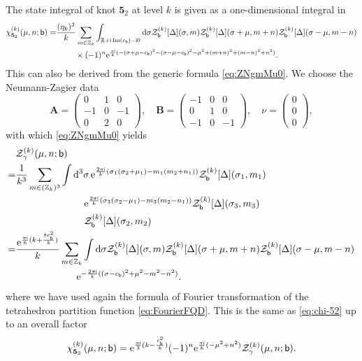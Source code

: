 \documentclass[a4paper,11pt]{article}	%
\DeclareMathOperator{\imag}{Im}
\def\mc{\mathcal}
\def\md{\mathbf}
\def\ms{\mathsf}
\def\IR{\mathbb{R}}
\def\IZ{\mathbb{Z}}
\newcommand{\re}{{\rm e}}
\newcommand{\ri}{{\mathsf{i}}}
\newcommand{\rd}{{\rm d}}
\newcommand{\nn}{\nonumber \\}
\newcommand{\bb}{\ms{b}}
\newcommand{\s}{\sigma}
\newcommand{\knot}[1]{\md{#1}}
\begin{document}
The state integral of knot $\knot{5}_2$ at level $k$ is given as a
one-dimensional integral in \cite{Andersen:2016ugz}
\begin{align}
  \chi^{(k)}_{\knot{5}_2}(\mu,n;\bb) =
  &\frac{(\eta_k)^3}{k}\sum_{m\in\IZ_k}
    \int_{\IR+\ri\imag(c_\bb)-\ri 0}\rd \sigma
    \mc{Z}^{(k)}_\bb[\Delta](\sigma,m)                                          \mc{Z}^{(k)}_\bb[\Delta](\sigma+\mu,m+n)
    \mc{Z}^{(k)}_\bb[\Delta](\sigma-\mu,m-n)\nn
  &\phantom{===}\times(-1)^{n}
    \re^{\frac{\pi\ri}{k}(-(\sigma+\mu-c_\bb)^2-(\sigma-\mu-c_\bb)^2-\mu^2+(m+n)^2+(m-n)^2+n^2)}.      \label{eq:chi-52}
\end{align}
This can also be derived from the generic formula \eqref{eq:ZNgmMu0}.
We choose the Neumann-Zagier data
\begin{equation}
  \pmb{A} = 
  \begin{pmatrix}
    0 & 1 & 0\\
    -1&0&-1\\
    0&2&0
  \end{pmatrix},\quad \pmb{B} =
  \begin{pmatrix}
    -1&0&0\\
    0&1&0\\
    -1&0&-1
  \end{pmatrix},\quad \nu =
  \begin{pmatrix}
    0\\0\\0
  \end{pmatrix},
\end{equation}
with which \eqref{eq:ZNgmMu0} yields
\begin{align}
  &\mc{Z}_\gamma^{(k)}(\mu,n;\bb)\nn =
  &\frac{1}{k^3}\sum_{m\in(\IZ_k)^3}\int\rd^3\s\,
    \re^{\frac{2\pi\ri}{k}(\s_1(\s_2+\mu_1)-m_1(m_2+n_1))}
    \mc{Z}_\bb^{(k)}[\Delta](\s_1,m_1)\nn
  &\phantom{=========}
    \re^{\frac{2\pi\ri}{k}(\s_3(\s_2-\mu_1)-m_3(m_2-n_1))}
    \mc{Z}_\bb^{(k)}[\Delta](\s_3,m_3)\nn
  &\phantom{=========}
    \mc{Z}_\bb^{(k)}[\Delta](\s_2,m_2)
    \nn=
  &\frac{\re^{\frac{\pi\ri}{6}(k+\frac{8c_\bb^2}{k})}}{k}
    \sum_{m\in\IZ_k}\int\rd \s
    \mc{Z}_\bb^{(k)}[\Delta](\s,m)
    \mc{Z}_\bb^{(k)}[\Delta](\s+\mu,m+n)
    \mc{Z}_\bb^{(k)}[\Delta](\s-\mu,m-n)
    \nn
  &\phantom{========}
    \re^{-\frac{2\pi\ri}{k}((\s-c_\bb)^2+\mu^2-m^2-n^2)}.
\end{align}
where we have used again the formula of Fourier transformation of the
tetrahedron partition function \eqref{eq:FourierFQD}.
This is the same as \eqref{eq:chi-52} up to an overall factor
\begin{equation}
  \chi^{(k)}_{\knot{5}_2}(\mu,n;\bb) =
  \re^{\frac{\pi\ri}{3}(k-\frac{c_\bb^2}{k})} (-1)^n
  \re^{\frac{\pi\ri}{k}(-\mu^2+n^2)}\mc{Z}_\gamma^{(k)}(\mu,n;\bb).
\end{equation}
\end{document}
